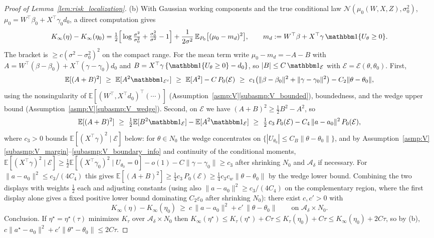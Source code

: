 \documentclass[11pt]{article}
\theoremstyle{definition}
\theoremstyle{plain}
\newcommand{\E}{\mathbb{E}}
\begin{document}
\begin{proof}[Proof of Lemma~\ref{lem:risk_localization}]
(b) With Gaussian working components and the true conditional law $\mathcal N(\mu_0(W,X,Z),\sigma_0^2)$, $\mu_0=W^\top\beta_0+X^\top\gamma_0d_0$, a direct computation gives
\[
K_\infty(\eta)-K_\infty(\eta_0)
=\tfrac12\Big[\log\tfrac{\sigma^2}{\sigma_0^2}+\tfrac{\sigma_0^2}{\sigma^2}-1\Big]
+\frac{1}{2\sigma^2}\,\E_{P_0}\big[(\mu_0-m_d)^2\big],
\qquad m_d:=W^\top\beta+X^\top\gamma\,\mathbbm 1\{U_\theta\ge0\}.
\]
The bracket is $\ge c(\sigma^2-\sigma_0^2)^2$ on the compact range. For the mean term write
$\mu_0-m_d=-A-B$ with
$A=W^\top(\beta-\beta_0)+X^\top(\gamma-\gamma_0)d_0$ and
$B=X^\top\gamma\,\{\mathbbm 1\{U_\theta\ge0\}-d_0\}$, so $|B|\le C\,\mathbbm 1_{\mathcal E}$ with $\mathcal E=\mathcal E(\theta,\theta_0)$. First,
\[
\E[(A+B)^2]\ \ge\ \E[A^2\mathbbm 1_{\mathcal E^c}]\ \ge\ \E[A^2]-C\,P_0(\mathcal E)
\ \ge\ c_1\big(\|\beta-\beta_0\|^2+\|\gamma-\gamma_0\|^2\big)-C_2\|\theta-\theta_0\|,
\]
using the nonsingularity of $\E[(W^\top,X^\top d_0)^\top(\cdots)]$ (Assumption~\ref{asmp:V}\ref{subasmp:V_bounded}), boundedness, and the wedge upper bound (Assumption~\ref{asmp:V}\ref{subasmp:V_wedge}). Second, on $\mathcal E$ we have $(A+B)^2\ge\tfrac12B^2-A^2$, so
\[
\E[(A+B)^2]\ \ge\ \tfrac12\E[B^2\mathbbm 1_{\mathcal E}]-\E[A^2\mathbbm 1_{\mathcal E}]
\ \ge\ \tfrac12\,c_3\,P_0(\mathcal E)-C_4\,\|a-a_0\|^2\,P_0(\mathcal E),
\]
where $c_3>0$ bounds $\E[(X^\top\gamma)^2\mid\mathcal E]$ below: for $\theta\in N_0$ the wedge concentrates on $\{|U_{\theta_0}|\le C_B\|\theta-\theta_0\|\}$, and by Assumption~\ref{asmp:V}\ref{subasmp:V_margin}--\ref{subasmp:V_boundary_info} and continuity of the conditional moments, $\E[(X^\top\gamma)^2\mid\mathcal E]\ge\tfrac12\E[(X^\top\gamma_0)^2\mid U_{\theta_0}=0]-o(1)-C\|\gamma-\gamma_0\|\ge c_3$ after shrinking $N_0$ and $\mathcal A_\delta$ if necessary. For $\|a-a_0\|^2\le c_3/(4C_4)$ this gives
$\E[(A+B)^2]\ge\tfrac14c_3\,P_0(\mathcal E)\ge\tfrac14c_3c_w\|\theta-\theta_0\|$
by the wedge lower bound. Combining the two displays with weights $\tfrac12$ each and adjusting constants (using also $\|a-a_0\|^2\ge c_3/(4C_4)$ on the complementary region, where the first display alone gives a fixed positive lower bound dominating $C_2\varepsilon_0$ after shrinking $N_0$): there exist $c,c'>0$ with
\[
K_\infty(\eta)-K_\infty(\eta_0)\ \ge\ c\,\|a-a_0\|^2+c'\,\|\theta-\theta_0\|
\qquad\text{on }\mathcal A_\delta\times N_0 .
\]
Conclusion. If $\eta^\star=\eta^\star(\tau)$ minimizes $K_\tau$ over $\mathcal A_\delta\times N_0$ then
$K_\infty(\eta^\star)\le K_\tau(\eta^\star)+C\tau\le K_\tau(\eta_0)+C\tau\le K_\infty(\eta_0)+2C\tau$,
so by (b), $c\|a^\star-a_0\|^2+c'\|\theta^\star-\theta_0\|\le2C\tau$.
\end{proof}
\end{document}
